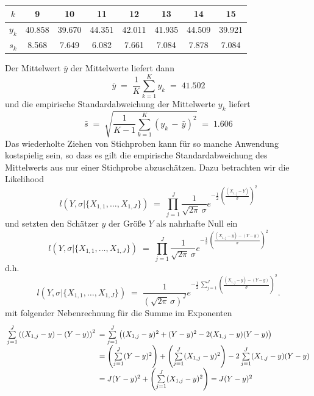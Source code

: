 \vspace{3mm}

\begin{tabular}{c||c|c|c|c|c|c|c}
$k$   &  9     &    10  &   11   &   12   &   13   &   14   &   15  \\
\hline\hline
$y_k$ & 40.858 & 39.670 & 44.351 & 42.011 & 41.935 & 44.509 & 39.921\\
\hline
$s_k$ &  8.568 &  7.649 &  6.082 &  7.661 &  7.084 &  7.878 &  7.084\\
\end{tabular}

Der Mittelwert $\bar y$ der Mittelwerte liefert dann
$$
\bar y \; = \; \frac{1}{K} \sum\limits_{k=1}^K y_k \; = \; 41.502
$$
und die empirische Standardabweichung der Mittelwerte $y_k$ liefert
$$
\bar s \; = \; \sqrt{\frac{1}{K-1} \sum\limits_{k=1}^K (y_k \, - \, \bar y)^2 }
 \; = \; 1.606
$$
Das wiederholte Ziehen von Stichproben kann für so manche Anwendung kostspielig sein,
so dass es gilt die empirische Standardabweichung des Mittelwerts aus nur einer
Stichprobe abzuschätzen.
Dazu betrachten wir die Likelihood
\begin{equation}
l(Y, \sigma | \{X_{1,1}, \dots, X_{1,J}\}) \; = \;
\prod\limits_{j=1}^J \frac{1}{\sqrt{2 \pi} \, \sigma}
 e^{- \frac{1}{2} \, \left( \frac{(X_{1,j} - Y)}{\sigma} \right)^2 }
\label{LikelihoodY}
\end{equation}
und
setzten den Schätzer $y$ der Größe $Y$ als nahrhafte Null ein
\begin{equation}
l(Y, \sigma | \{X_{1,1}, \dots, X_{1,J}\}) \; = \;
\prod\limits_{j=1}^J \frac{1}{\sqrt{2 \pi} \, \sigma}
 e^{- \frac{1}{2} \, \left( \frac{(X_{1,j} - y) - (Y - y)}{\sigma} \right)^2 }
\label{LikelihoodNahrhafteNull}
\end{equation}
d.h.
\begin{equation}
l(Y, \sigma | \{X_{1,1}, \dots, X_{1,J}\}) \; = \;
 \frac{1}{(\sqrt{2 \pi} \, \sigma)^J}
 e^{- \frac{1}{2} \, \sum\limits_{j=1}^J \left( \frac{(X_{1,j} - y) - (Y - y)}{\sigma} \right)^2 } .
\end{equation}
mit folgender Nebenrechnung für die Summe im Exponenten
$$
\arraycolsep=2.4pt\def\arraystretch{2}
\begin{array}{ll}
\sum\limits_{j=1}^J \left( (X_{1,j} - y) - (Y - y) \right)^2  & =
\sum\limits_{j=1}^J \left( (X_{1,j} - y)^2 + (Y - y)^2 - 2 (X_{1,j} - y) (Y - y) \right) \\
 & = \left( \sum\limits_{j=1}^J  (Y - y)^2\right) +
 \left( \sum\limits_{j=1}^J  (X_{1,j} - y)^2\right) - 2 \sum\limits_{j=1}^J (X_{1,j} - y) (Y - y)\\
 & = J (Y - y)^2 +
 \left( \sum\limits_{j=1}^J  (X_{1,j} - y)^2\right) = J (Y - y)^2
\end{array}
$$
